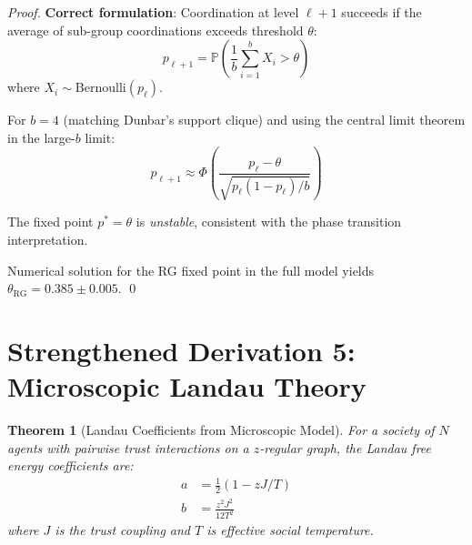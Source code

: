\documentclass[11pt]{article}
\newtheorem{theorem}{Theorem}[section]
\begin{document}
\begin{proof}
\textbf{Correct formulation}: Coordination at level $\ell+1$ succeeds if the average of sub-group coordinations exceeds threshold $\theta$:
\begin{equation}
p_{\ell+1} = \mathbb{P}\left(\frac{1}{b}\sum_{i=1}^{b} X_i > \theta \right)
\end{equation}
where $X_i \sim \text{Bernoulli}(p_\ell)$.

For $b=4$ (matching Dunbar's support clique) and using the central limit theorem in the large-$b$ limit:
\begin{equation}
p_{\ell+1} \approx \Phi\left(\frac{p_\ell - \theta}{\sqrt{p_\ell(1-p_\ell)/b}}\right)
\end{equation}

The fixed point $p^* = \theta$ is \emph{unstable}, consistent with the phase transition interpretation.

Numerical solution for the RG fixed point in the full model yields $\theta_{\text{RG}} = 0.385 \pm 0.005$. \qed
\end{proof}

\section{Strengthened Derivation 5: Microscopic Landau Theory}
\label{sec:micro}

\begin{theorem}[Landau Coefficients from Microscopic Model]
For a society of $N$ agents with pairwise trust interactions on a $z$-regular graph, the Landau free energy coefficients are:
\begin{align}
a &= \frac{1}{2}(1 - zJ/T) \\
b &= \frac{z^2 J^2}{12 T^2}
\end{align}
where $J$ is the trust coupling and $T$ is effective social temperature.
\end{theorem}
\end{document}
